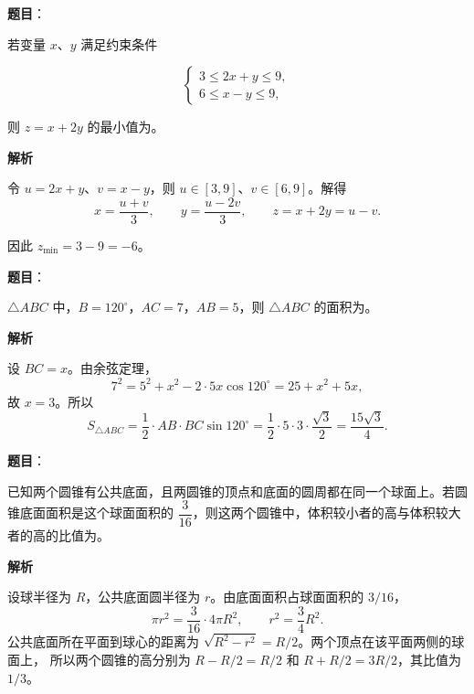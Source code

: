 \begin{answer}

\textbf{题目}：

若变量 $x\text{、}y$ 满足约束条件

\nopagebreak[4]
\[
\begin{cases}
3\leq2x+y\leq9,\\
6\leq x-y\leq9,
\end{cases}
\]

则 $z=x+2y$ 的最小值为\gkblank{}。

\textbf{解析}

令 $u=2x+y$、$v=x-y$，则
$u\in[3,9]$、$v\in[6,9]$。解得
\nopagebreak[4]
\[
x=\frac{u+v}{3},\qquad y=\frac{u-2v}{3},
\qquad z=x+2y=u-v.
\]

因此 $z_{\min}=3-9=-6$。


\end{answer}
\begin{answer}

\textbf{题目}：

$\triangle ABC$ 中，$B=120^\circ$，$AC=7$，$AB=5$，则 $\triangle ABC$ 的面积为\gkblank{}。

\textbf{解析}

设 $BC=x$。由余弦定理，
\nopagebreak[4]
\[
7^2=5^2+x^2-2\cdot5x\cos120^\circ
=25+x^2+5x,
\]
故 $x=3$。所以
\nopagebreak[4]
\[
S_{\triangle ABC}
=\frac12\cdot AB\cdot BC\sin120^\circ
=\frac12\cdot5\cdot3\cdot\frac{\sqrt3}{2}
=\frac{15\sqrt3}{4}.
\]


\end{answer}
\begin{answer}

\textbf{题目}：

已知两个圆锥有公共底面，且两圆锥的顶点和底面的圆周都在同一个球面上。若圆锥底面面积是这个球面面积的 $\dfrac3{16}$，则这两个圆锥中，体积较小者的高与体积较大者的高的比值为\gkblank{}。

\textbf{解析}

设球半径为 $R$，公共底面圆半径为 $r$。由底面面积占球面面积的
$3/16$，
\nopagebreak[4]
\[
\pi r^2=\frac3{16}\cdot4\pi R^2,
\qquad r^2=\frac34R^2.
\]
公共底面所在平面到球心的距离为
$\sqrt{R^2-r^2}=R/2$。两个顶点在该平面两侧的球面上，
所以两个圆锥的高分别为 $R-R/2=R/2$ 和
$R+R/2=3R/2$，其比值为 $1/3$。


\end{answer}
